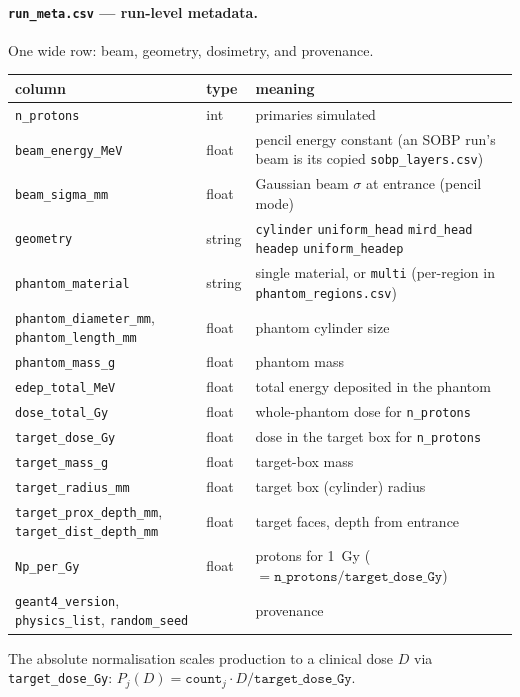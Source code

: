 \documentclass[11pt]{article}
\newcommand{\file}[1]{\texttt{#1}}
\begin{document}
\paragraph{\file{run\_meta.csv} --- run-level metadata.} One wide row: beam,
geometry, dosimetry, and provenance.
\begin{center}
\begin{tabular}{@{}lll@{}}
\toprule
column & type & meaning \\
\midrule
\file{n\_protons} & int & primaries simulated \\
\file{beam\_energy\_MeV} & float & pencil energy constant (an SOBP run's beam is its copied \file{sobp\_layers.csv}) \\
\file{beam\_sigma\_mm} & float & Gaussian beam $\sigma$ at entrance (pencil mode) \\
\file{geometry} & string & \file{cylinder} \textbar{} \file{uniform\_head} \textbar{} \file{mird\_head} \textbar{} \file{headep} \textbar{} \file{uniform\_headep} \\
\file{phantom\_material} & string & single material, or \file{multi} (per-region in \file{phantom\_regions.csv}) \\
\file{phantom\_diameter\_mm}, \file{phantom\_length\_mm} & float & phantom cylinder size \\
\file{phantom\_mass\_g} & float & phantom mass \\
\file{edep\_total\_MeV} & float & total energy deposited in the phantom \\
\file{dose\_total\_Gy} & float & whole-phantom dose for \file{n\_protons} \\
\file{target\_dose\_Gy} & float & dose in the target box for \file{n\_protons} \\
\file{target\_mass\_g} & float & target-box mass \\
\file{target\_radius\_mm} & float & target box (cylinder) radius \\
\file{target\_prox\_depth\_mm}, \file{target\_dist\_depth\_mm} & float & target faces, depth from entrance \\
\file{Np\_per\_Gy} & float & protons for \SI{1}{Gy} ($=\file{n\_protons}/\file{target\_dose\_Gy}$) \\
\file{geant4\_version}, \file{physics\_list}, \file{random\_seed} & & provenance \\
\bottomrule
\end{tabular}
\end{center}
The absolute normalisation scales production to a clinical dose $D$ via
\file{target\_dose\_Gy}: $P_j(D)=\file{count}_j\cdot D/\file{target\_dose\_Gy}$.
\end{document}
